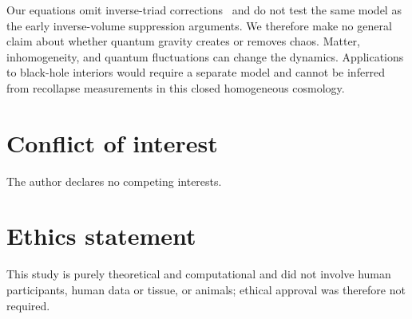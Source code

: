 \documentclass[12pt]{iopjournal}
\begin{document}
Our equations omit inverse-triad corrections~\cite{CorichiKarami2016} and do not test the same
model as the early inverse-volume suppression arguments. We therefore make no general claim about whether quantum gravity creates or removes chaos. Matter, inhomogeneity, and quantum fluctuations
can change the dynamics. Applications to black-hole interiors would require a separate model and
cannot be inferred from recollapse measurements in this closed homogeneous cosmology.



\section*{Conflict of interest}
The author declares no competing interests.

\section*{Ethics statement}
This study is purely theoretical and computational and did not involve human participants, human data or tissue, or animals; ethical approval was therefore not required.


\FloatBarrier
\appendix
\end{document}
